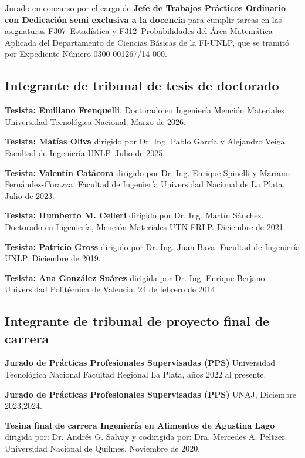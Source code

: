 \documentclass[margin,line]{res}
\begin{document}
\begin{resume}
Jurado en concurso por el cargo de {\bf Jefe de Trabajos Prácticos Ordinario con Dedicación semi exclusiva  a la docencia} para cumplir tareas en las asignaturas F307--Estadística y F312--Probabilidades del Área Matemática Aplicada del Departamento de Ciencias Básicas de la FI-UNLP, que se tramitó por Expediente Número 0300-001267/14-000.


 \subsection{ Integrante de tribunal de tesis de doctorado}

{\bf Tesista: Emiliano Frenquelli}. Doctorado en Ingeniería Mención Materiales Universidad Tecnológica Nacional. Marzo de 2026.

{\bf Tesista: Matías Oliva} dirigido por Dr. Ing. Pablo García y Alejandro Veiga. Facultad de Ingeniería UNLP. Julio de 2025.

{\bf Tesista: Valentín Catácora} dirigido por Dr. Ing. Enrique Spinelli y Mariano Fernández-Corazza. Facultad de Ingeniería Universidad Nacional de La Plata. Julio de 2023.

{\bf Tesista: Humberto M. Celleri} dirigido por Dr. Ing. Martín Sánchez. Doctorado en Ingeniería, Mención Materiales UTN-FRLP. Diciembre de 2021. 

{\bf Tesista: Patricio Gross} dirigido por Dr. Ing. Juan Bava. Facultad de Ingeniería UNLP. Diciembre de 2019.
 
{\bf Tesista: Ana González Suárez} dirigida por Dr. Ing. Enrique Berjano. Universidad Politécnica de Valencia. 24 de febrero de 2014.

\subsection{ Integrante de tribunal de proyecto final de carrera}

{\bf Jurado de Prácticas Profesionales Supervisadas (PPS)} Universidad Tecnológica Nacional Facultad Regional La Plata, años 2022 al presente.

{\bf Jurado de Prácticas Profesionales Supervisadas (PPS)} UNAJ, Diciembre 2023,2024.

{\bf Tesina final de carrera Ingeniería en Alimentos de Agustina Lago} dirigida por: Dr. Andrés G. Salvay y codirigida por: Dra. Mercedes A. Peltzer. Universidad Nacional de Quilmes. Noviembre de 2020.
%


\end{resume}
\end{document}

